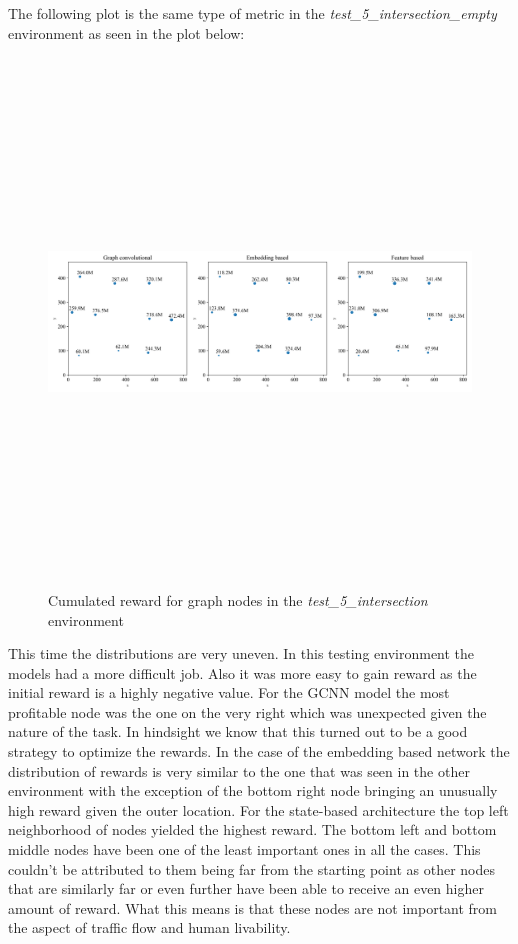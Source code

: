 \documentclass[
]{elteikthesis}[2023/04/10]
\begin{document}
The following plot is the same type of metric in the \emph{test\_5\_intersection\_empty}
environment as seen in the plot below: 

\begin{figure}[H]
\begin{centering}
\includegraphics[width=14cm,height=14cm,keepaspectratio]{images/node_reward_plot_node_weights_plot_test_5_intersection_empty}
\par\end{centering}
\caption{Cumulated reward for graph nodes in the \emph{test\_5\_intersection}
environment}
\end{figure}

This time the distributions are very uneven. In this testing environment
the models had a more difficult job. Also it was more easy to gain
reward as the initial reward is a highly negative value. For the GCNN
model the most profitable node was the one on the very right which
was unexpected given the nature of the task. In hindsight we know
that this turned out to be a good strategy to optimize the rewards.
In the case of the embedding based network the distribution of rewards
is very similar to the one that was seen in the other environment
with the exception of the bottom right node bringing an unusually
high reward given the outer location. For the state-based architecture
the top left neighborhood of nodes yielded the highest reward. The
bottom left and bottom middle nodes have been one of the least important
ones in all the cases. This couldn't be attributed to them being far
from the starting point as other nodes that are similarly far or even
further have been able to receive an even higher amount of reward.
What this means is that these nodes are not important from the aspect
of traffic flow and human livability.
\end{document}
